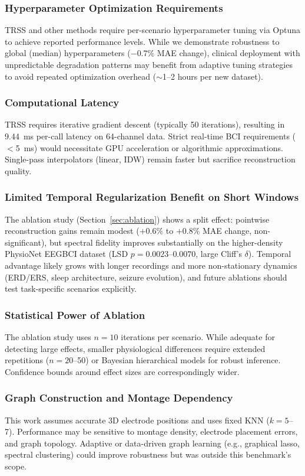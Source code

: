 \subsubsection{Hyperparameter Optimization Requirements}
TRSS and other methods require per-scenario hyperparameter tuning via Optuna to achieve reported performance levels. While we demonstrate robustness to global (median) hyperparameters ($-0.7\%$ MAE change), clinical deployment with unpredictable degradation patterns may benefit from adaptive tuning strategies to avoid repeated optimization overhead ($\sim$1--2 hours per new dataset).

\subsubsection{Computational Latency}
TRSS requires iterative gradient descent (typically 50 iterations), resulting in 9.44~ms per-call latency on 64-channel data. Strict real-time BCI requirements ($<$5~ms) would necessitate GPU acceleration or algorithmic approximations. Single-pass interpolators (linear, IDW) remain faster but sacrifice reconstruction quality.

\subsubsection{Limited Temporal Regularization Benefit on Short Windows}
The ablation study (Section~\ref{sec:ablation}) shows a split effect: pointwise reconstruction gains remain modest ($+0.6\%$ to $+0.8\%$ MAE change, non-significant), but spectral fidelity improves substantially on the higher-density PhysioNet EEGBCI dataset (LSD $p=0.0023$--$0.0070$, large Cliff's $\delta$). Temporal advantage likely grows with longer recordings and more non-stationary dynamics (ERD/ERS, sleep architecture, seizure evolution), and future ablations should test task-specific scenarios explicitly.

\subsubsection{Statistical Power of Ablation}
The ablation study uses $n=10$ iterations per scenario. While adequate for detecting large effects, smaller physiological differences require extended repetitions ($n=20$--50) or Bayesian hierarchical models for robust inference. Confidence bounds around effect sizes are correspondingly wider.

\subsubsection{Graph Construction and Montage Dependency}
This work assumes accurate 3D electrode positions and uses fixed KNN ($k=5$--7). Performance may be sensitive to montage density, electrode placement errors, and graph topology. Adaptive or data-driven graph learning (e.g., graphical lasso, spectral clustering) could improve robustness but was outside this benchmark's scope.

